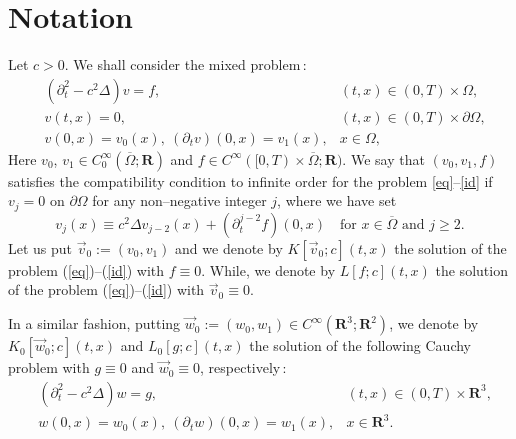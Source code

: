\documentclass[12pt]{amsart}
\newcommand{\R}{{\mathbf R}}
\numberwithin{equation}{section}
\begin{document}
\section{Notation}
Let $c>0$.
We shall consider the mixed problem\,:
\begin{align}\label{eq}
& (\partial_t^2-c^2\Delta) v =f, & (t,x) \in (0,T)\times \Omega,
\\ \label{dc}
& v(t,x)=0, & (t,x) \in (0,T)\times \partial\Omega,
\\ \label{id}
& v(0,x)=v_0(x),\ (\partial_t v)(0,x)=v_1(x), & x\in \Omega,
\end{align}
Here $v_0$, $v_1 \in C^\infty_0(\overline{\Omega};\R)$ and 
$f \in C^\infty([0,T)\times \overline{\Omega};\R)$.
We say that $({v}_0, {v}_1, f)$ satisfies the compatibility condition
to infinite order for the problem \eqref{eq}--\eqref{id} if 
$v_j=0$ {on} $\partial\Omega$ for 
any non--negative integer $j$,
where we have set
\begin{equation}\label{data+}
v_j(x)\equiv c^2\Delta v_{j-2}(x)+(\partial_t^{j-2} f)(0,x)
\quad \mbox{for \ $x \in \overline{\Omega}$ \ and \ $j\ge 2$}.
\end{equation}
Let us put $\vec{v}_0:=(v_0, v_1)$ and we denote by $K[\vec{v}_0;c](t,x)$ the solution
of the problem (\ref{eq})--(\ref{id}) with $f \equiv 0$.
While, we denote by $L[f;c](t,x)$ the solution
of the problem (\ref{eq})--(\ref{id}) with $\vec{v}_0 \equiv 0$.

In a similar fashion, putting $\vec{w}_0:=(w_0,w_1)\in C^\infty(\R^3;\R^2)$, we denote by $K_0[\vec{w}_0;c](t,x)$ and
$L_0[g;c](t,x)$ the solution of the following Cauchy problem 
with $g \equiv 0$ and $\vec{w}_0 \equiv 0$, respectively\,:
\begin{align}\label{eq0}
&(\partial_t^2-c^2\Delta) w = g, & (t,x) \in (0,T)\times \R^3,
\\ \label{id0}
& w(0,x)=w_0(x),\ (\partial_t w)(0,x)=w_1(x), & x\in \R^3.
\end{align}
\end{document}
